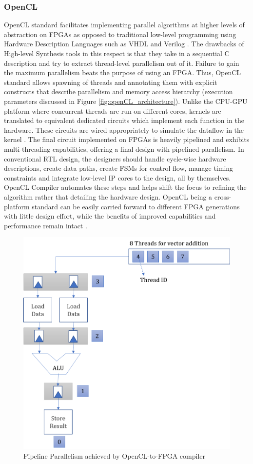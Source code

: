 \subsubsection{OpenCL}
\label{2_3_2_2}
OpenCL standard facilitates implementing parallel algorithms at higher levels of abstraction on FPGAs as opposed to traditional low-level programming using Hardware Description Languages such as VHDL and Verilog \cite{opencl_vhblog}. The drawbacks of High-level Synthesis tools in this respect is that they take in a sequential C description and try to extract thread-level parallelism out of it. Failure to gain the maximum parallelism beats the purpose of using an FPGA. Thus, OpenCL standard allows spawning of threads and annotating them with explicit constructs that describe parallelism and memory access hierarchy (execution parameters discussed in Figure \ref{fig:openCL_architecture}).\newline \newline
Unlike the CPU-GPU platform where concurrent threads are run on different cores, kernels are translated to equivalent dedicated circuits which implement each function in the hardware. These circuits are wired appropriately to simulate the dataflow in the kernel \cite{singh2011implementing}. The final circuit implemented on FPGAs is heavily pipelined and exhibits multi-threading capabilities, offering a final design with pipelined parallelism.\newline \newline
In conventional RTL design, the designers should handle cycle-wise hardware descriptions, create data paths, create FSMs for control flow, manage timing constraints and integrate low-level IP cores to the design, all by themselves. OpenCL Compiler automates these steps and helps shift the focus to refining the algorithm rather that detailing the hardware design. OpenCL being a cross-platform standard can be easily carried forward to different FPGA generations with little design effort, while the benefits of improved capabilities and performance remain intact \cite{singh2011implementing}.
\begin{figure}[h!]
  \centering
  \includegraphics[width=0.6\linewidth]{figures/pipelined_parallelism_fpga_opencl.png}
  \caption{Pipeline Parallelism achieved by OpenCL-to-FPGA compiler
  \cite{singh2011implementing}}
  \label{fig:pipeline_parallelism_fpga_opencl}
\end{figure}
